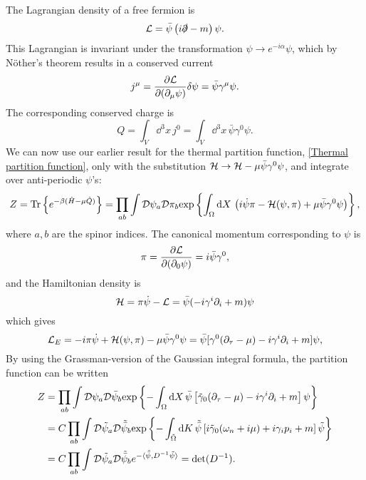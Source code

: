 The Lagrangian density of a free fermion is
\begin{equation}
    \mathcal{L} = \bar \psi \left( i \slashed{\partial} - m \right) \psi.
\end{equation}
This Lagrangian is invariant under the transformation $\psi \rightarrow e^{-i \alpha} \psi$, which by Nöther's theorem results in a conserved current
\begin{equation}
    j^\mu = \pdv{\mathcal{L}}{(\partial_\mu \psi)} \delta \psi=  \bar \psi \gamma^\mu \psi.
\end{equation}
The corresponding conserved charge is 
\begin{equation}
    Q = \int_V \dd^3 x\, j^0 = \int_V \dd^3 x \, \bar \psi \gamma^0 \psi.
\end{equation}
We can now use our earlier result for the thermal partition function, \autoref{Thermal partition function}, only with the substitution $\mathcal{H} \rightarrow \mathcal{H} - \mu \bar \psi \gamma^0 \psi$, and integrate over anti-periodic $\psi$'s:
\begin{equation*}
    Z = \text{Tr} \left\{ e^{-\beta(\hat H - \mu \hat Q)} \right\}
    = \prod_{a b}\int \mathcal D \psi_a\mathcal D \pi_b \text{exp} \left\{ 
        \int_{\Omega} \text{d} X \, 
        \left(
            i\dot \psi \pi - \mathcal{H}(\psi, \pi) + \mu \bar \psi \gamma^0 \psi
        \right)
     \right\},
\end{equation*}
where $a, b$ are the spinor indices.
The canonical momentum corresponding to $\psi$ is
\begin{equation}
    \pi = \pdv{\mathcal{L}}{(\partial_0 \psi)} = i \bar \psi \gamma^0,
\end{equation}
and the Hamiltonian density is 
\begin{equation}
    \mathcal{H} = \pi \dot\psi - \mathcal{L}
    = \bar \psi (-i\gamma^i\partial_i + m) \psi
\end{equation}
which gives
\begin{equation}
    \mathcal{L}_E = 
    - i \pi \dot\psi + \mathcal{H}(\psi, \pi) - \mu \bar \psi \gamma^0 \psi
    = \bar\psi[\gamma^0 (\partial_\tau - \mu) - i\gamma^i \partial_i + m] \psi,
\end{equation}
By using the Grassman-version of the Gaussian integral formula, the partition function can be written
\begin{align*}
    Z & = \prod_{a b}\int \mathcal D \psi_a\mathcal D \bar \psi_b 
    \text{exp} \left\{ 
        - \int_\Omega \text{d} X \, \bar \psi
        \left[
            \tilde\gamma_0(\partial_\tau -\mu) -  i \gamma^i \partial_i + m
        \right]
        \psi
     \right\}\\
    & = C \prod_{a b}\int \mathcal D \tilde \psi_a\mathcal D \tilde {\bar \psi}_b 
    \text{exp} \left\{ 
        - \int_{\tilde \Omega} \text{d} K \, \tilde {\bar \psi}
        \left[
            i \tilde\gamma_0(\omega_n + i\mu) + i \gamma_i p_i + m
        \right]
        \tilde \psi
     \right\} \\
    & = C \prod_{a b}\int \mathcal D \tilde \psi_a\mathcal D \tilde {\bar \psi}_b 
    e^{- \langle \tilde {\bar \psi}, D^{-1} \tilde \psi\rangle} 
    = \det(D^{-1}).
\end{align*}
